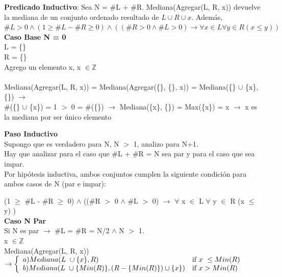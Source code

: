 \documentclass{article}
\theoremstyle{definition}
\theoremstyle{remark}
\begin{document}
\textbf{Predicado Inductivo}: Sea N = \#L + \#R. Mediana(Agregar(L, R, x)) devuelve la mediana de un conjunto ordenado resultado  de ${L} \cup {R} \cup {x}$. Además, $\#L > 0  \wedge  (1 \geq \#L - \#R \geq 0) \wedge ((\#R > 0 \wedge \#L > 0) \rightarrow \forall x \in L \forall y \in R (x \leq y) )$ \\ 
    


\textbf{Caso Base N = 0} \\

L = \{\} \\  

R = \{\} \\ 

Agrego un elemento x, x $\in \mathds{Z}$ \\ \\

Mediana(Agregar(L, R, x)) = 
Mediana(Agregar(\{\}, \{\}, x)) =
Mediana(\{\} $\cup$ \{x\}, \{\}) $\rightarrow$ \\ 
\#(\{\} $\cup$ \{x\}) = 1 $>$ 0 = \#(\{\}) $\rightarrow$
Mediana(\{x\}, \{\}) = Max(\{x\}) = x $\rightarrow$ x es la mediana por ser único elemento

\textbf{Paso Inductivo} \\

Supongo que es verdadero para N, N $>$ 1, analizo para N+1.\\

Hay que analizar para el caso que \#L + \#R = N sea par y para el caso que sea impar. \\

Por hipótesis inductiva, ambos conjuntos cumplen la siguiente condición para ambos casos de N (par e impar): 

(1 $\geq$ \#L - \#R $\geq$ 0) $\wedge$ ((\#R $>$ 0 $\wedge$ \#L $>$ 0) $\rightarrow$ $\forall$ x $\in$ L $\forall$ y $\in$ R (x $\leq$ y) ) \\

\textbf{Caso N Par}\\ 

Si N es par $\rightarrow$ \#L = \#R = N/2 $\wedge$ N $>$ 1.\\ 

x $\in \mathds{Z}$ \\

Mediana(Agregar(L, R, x)) $\rightarrow \twopartdef{ a) Mediana(L \ \cup \{x\}, R)}
                                                        {x \ \leq Min(R)}
                                                    {b) Mediana(L  \ \cup \{Min(R)\}, (R - \{Min(R)\}) \cup \{x\})}
                                                        {x > Min(R)}$\\
                                                        
\end{document}
